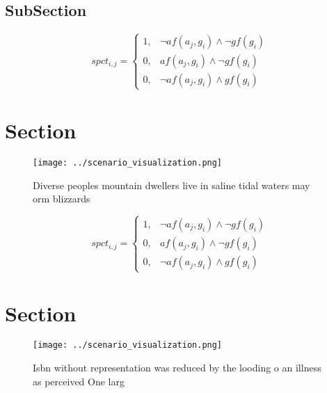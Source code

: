 \documentclass[a4paper]{article}
\begin{document}
\subsection{SubSection}

\begin{equation}
spct_{i,j} =
\begin{cases}
1, & \text{$\neg af(a_j,g_i) \wedge \neg gf(g_i)$}\\
0, & \text{$af(a_j,g_i) \wedge \neg gf(g_i)$}\\
0, & \text{$\neg af(a_j,g_i) \wedge gf(g_i)$}
\end{cases}
\end{equation}

\section{Section}

\begin{figure}
\centering
\texttt{[image: ../scenario\_visualization.png]}
\caption{Diverse peoples mountain dwellers live in saline tidal waters may orm blizzards
}
\end{figure}
 
\begin{equation}
spct_{i,j} =
\begin{cases}
1, & \text{$\neg af(a_j,g_i) \wedge \neg gf(g_i)$}\\
0, & \text{$af(a_j,g_i) \wedge \neg gf(g_i)$}\\
0, & \text{$\neg af(a_j,g_i) \wedge gf(g_i)$}
\end{cases}
\end{equation}

\section{Section}

\begin{figure}
\centering
\texttt{[image: ../scenario\_visualization.png]}
\caption{Isbn without representation was reduced by the looding o an illness as perceived One larg
}
\end{figure}
 
\end{document}
